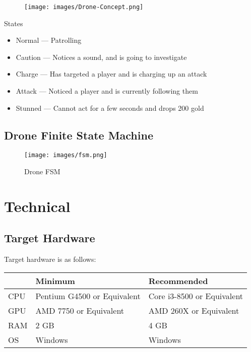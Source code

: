 \documentclass[10pt]{report}
\begin{document}
\begin{figure}
    \centering
    \texttt{[image: images/Drone-Concept.png]}
\end{figure}

States

\begin{itemize}
    \item Normal --- Patrolling
    \item Caution --- Notices a sound, and is going to investigate
    \item Charge --- Has targeted a player and is charging up an attack
    \item Attack --- Noticed a player and is currently following them
    \item Stunned --- Cannot act for a few seconds and drops 200 gold
\end{itemize}

\section{Drone Finite State Machine}

\begin{figure}[H]
    \centering
	\texttt{[image: images/fsm.png]}
	\caption{Drone FSM}
\end{figure}

\chapter{Technical}

\section{Target Hardware}

Target hardware is as follows:

\begin{center}
    \begin{tabular}{|l|l|l|}
        \hline
        & Minimum & Recommended \\ \hline
        CPU & Pentium G4500 or Equivalent & Core i3-8500 or Equivalent \\ \hline
        GPU & AMD 7750 or Equivalent & AMD 260X or Equivalent \\ \hline
        RAM & 2 GB & 4 GB \\ \hline
        OS & Windows & Windows \\
        \hline
    \end{tabular}
\end{center}
\end{document}
